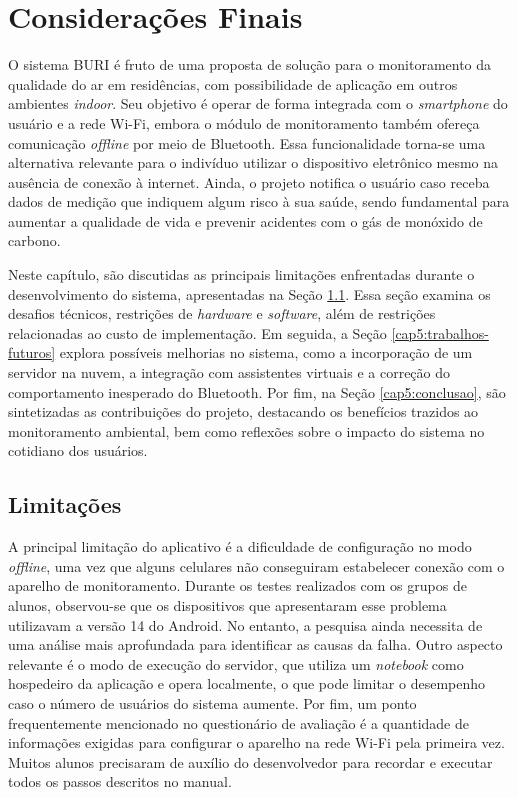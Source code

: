 \chapter{Considerações Finais}

O sistema BURI é fruto de uma proposta de solução para o monitoramento da qualidade do 
ar em residências, com possibilidade de aplicação em outros ambientes \textit{indoor}. Seu objetivo é 
operar de forma integrada com o \textit{smartphone} do usuário e a rede Wi-Fi, embora o módulo de 
monitoramento também ofereça comunicação \textit{offline} por meio de Bluetooth. Essa funcionalidade torna-se 
uma alternativa relevante para o indivíduo utilizar o dispositivo eletrônico mesmo na ausência de conexão à internet. Ainda, o 
projeto notifica o usuário caso receba dados de medição que indiquem algum risco à sua saúde, sendo fundamental para aumentar a qualidade de vida 
e prevenir acidentes com o gás de monóxido de carbono.

Neste capítulo, são discutidas as principais limitações enfrentadas durante o desenvolvimento do sistema, apresentadas na Seção \ref{cap5:limitacoes}. Essa seção examina os desafios técnicos, 
restrições de \textit{hardware} e \textit{software}, além de restrições relacionadas ao custo de implementação. Em seguida, a Seção \ref{cap5:trabalhos-futuros} explora possíveis melhorias no sistema, como a 
incorporação de um servidor na nuvem, a integração com assistentes virtuais e a correção do comportamento inesperado do Bluetooth. Por fim, na Seção \ref{cap5:conclusao}, são sintetizadas as contribuições do projeto, destacando os 
benefícios trazidos ao monitoramento ambiental, bem como reflexões sobre o impacto do sistema no cotidiano dos usuários.

\section{Limitações}\label{cap5:limitacoes}

A principal limitação do aplicativo é a dificuldade de configuração no modo \textit{offline}, uma vez que alguns celulares não conseguiram estabelecer conexão com o aparelho de monitoramento. Durante os testes realizados com os
grupos de alunos, observou-se que os dispositivos que apresentaram esse problema utilizavam a versão 14 do Android. No entanto, a pesquisa ainda necessita de uma análise mais aprofundada para identificar as causas da falha. Outro aspecto 
relevante é o modo de execução do servidor, que utiliza um \textit{notebook} como hospedeiro da aplicação e opera localmente, o que pode limitar o desempenho caso o número de usuários do sistema aumente. Por fim, um ponto frequentemente 
mencionado no questionário de avaliação é a quantidade de informações exigidas para configurar o aparelho na rede Wi-Fi pela primeira vez. Muitos alunos precisaram de auxílio do desenvolvedor para recordar e executar todos os passos descritos no manual.


